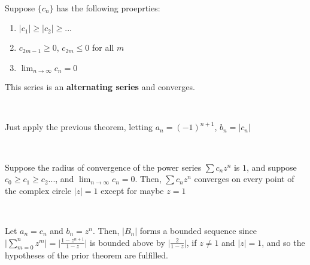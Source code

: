 \documentclass{article}
\begin{document}
\begin{theorem}
\

Suppose $\{c_n\}$ has the following proeprties: 

\begin{enumerate}
    \item $\vert c_1 \vert \geq \vert c_2 \vert \geq ...$
    \item $c_{2m-1} \geq 0$, $c_{2m} \leq 0$ for all $m$
    \item $\lim_{n \to \infty} c_n = 0$
\end{enumerate}

This series is an \textbf{alternating series} and converges. 
\end{theorem}

\begin{customproof}
\

Just apply the previous theorem, letting $a_n = (-1)^{n+1}$, $b_n = \vert c_n \vert$
\end{customproof}

\begin{theorem}
\

Suppose the radius of convergence of the power series $\sum c_n z^n$ is $1$, and suppose $c_0 \geq c_1 \geq c_2 ...$, and $\lim_{n \to \infty} c_n = 0$. Then, $\sum c_n z^n$ converges on every point of the complex circle $\vert z \vert = 1$ except for maybe $z = 1$
\end{theorem}

\begin{customproof}
\

Let $a_n = c_n$ and $b_n = z^n$. Then, $\vert B_n \vert$ forms a bounded sequence since $\vert \sum_{m=0}^n z^m \vert = \vert \frac{1 - z^{n+1}}{1-z} \vert$ is bounded above by $\vert \frac{2}{1-z} \vert$, if $z \neq 1$ and $\vert z \vert = 1$, and so the hypotheses of the prior theorem are fulfilled. 
\end{customproof}
\end{document}
